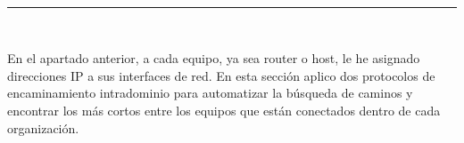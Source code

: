 
\begin{center}
	{\fboxrule=4pt } \\
	\setcounter{chapter}{2}
	\setcounter{section}{0}
	\rule{15cm}{0pt} \\
\end{center}

\par En el apartado anterior, a cada equipo, ya sea router o host, le he asignado direcciones IP a sus interfaces de red. En esta sección aplico dos protocolos de encaminamiento intradominio para automatizar la búsqueda de caminos y encontrar los más cortos entre los equipos que están conectados dentro de cada organización.



\newpage